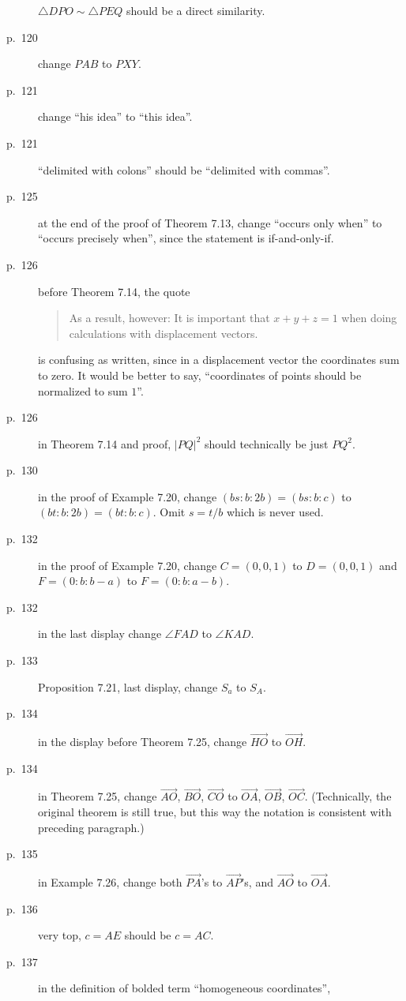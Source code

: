 \documentclass[11pt]{scrartcl}
\begin{document}
\begin{description}
  $\triangle DPO \sim \triangle PEQ$ should be a direct similarity.
\item[p.\  120] change $PAB$ to $PXY$.
\item[p.\  121] change ``his idea'' to ``this idea''.
\item[p.\  121] ``delimited with colons'' should be
  ``delimited with commas''.
\item[p.\  125] at the end of the proof of Theorem 7.13,
  change ``occurs only when'' to ``occurs precisely when'',
  since the statement is if-and-only-if.
\item[p.\  126] before Theorem 7.14, the quote
  \begin{quote}
    As a result, however:
    It is important that $x+y+z=1$ when doing calculations with displacement vectors.
  \end{quote}
  is confusing as written, since in a displacement vector the coordinates sum to zero.
  It would be better to say,
  ``coordinates of points should be normalized to sum $1$''.
\item[p.\  126] in Theorem 7.14 and proof, $|PQ|^2$ should technically be just $PQ^2$.
\item[p.\  130] in the proof of Example 7.20, change $(bs:b:2b)=(bs:b:c)$ to $(bt:b:2b)=(bt:b:c)$.
  Omit $s=t/b$ which is never used.
\item[p.\  132] in the proof of Example 7.20, change $C = (0, 0, 1)$ to $D = (0, 0, 1)$
  and $F = (0 : b : b - a)$ to $F = (0 : b : a - b)$.
\item[p.\  132] in the last display change $\angle FAD$ to $\angle KAD$.
\item[p.\  133] Proposition 7.21, last display, change $S_a$ to $S_A$.
\item[p.\  134] in the display before Theorem 7.25,
  change $\overrightarrow{HO}$ to $\overrightarrow{OH}$.
\item[p.\  134] in Theorem 7.25, change
  $\overrightarrow{AO}$, $\overrightarrow{BO}$, $\overrightarrow{CO}$ to
  $\overrightarrow{OA}$, $\overrightarrow{OB}$, $\overrightarrow{OC}$.
  (Technically, the original theorem is still true,
  but this way the notation is consistent with preceding paragraph.)
\item[p.\  135] in Example 7.26, change both $\overrightarrow{PA}$'s to $\overrightarrow{AP}$'s,
  and $\overrightarrow{AO}$ to $\overrightarrow{OA}$.
\item[p.\  136] very top, $c=AE$ should be $c=AC$.
\item[p.\  137] in the definition of bolded term ``homogeneous coordinates'',

\end{description}
\end{document}
